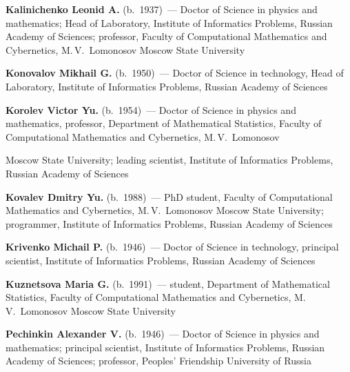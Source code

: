 \begin{multicols}{2}
\noindent
\textbf{Kalinichenko Leonid A.} (b.\ 1937)~--- Doctor of Science in physics and mathematics; 
Head of Laboratory, Institute of Informatics Problems, Russian Academy of Sciences; 
professor, Faculty of Computational Mathematics and Cybernetics, M.\,V.~Lomonosov 
Moscow State Univer\-sity 

\vspace*{3pt}


\noindent
\textbf{Konovalov Mikhail G.} (b.\ 1950)~--- Doctor of Science in technology, Head of 
Laboratory, Institute of Informatics Problems, Russian Academy of Sciences

\vspace*{3pt} 



\noindent \textbf{Korolev Victor Yu.} (b.\ 1954)~--- Doctor of Science in 
physics and mathematics, professor, Department of Mathematical Statistics, 
Faculty of Computational Mathematics and Cybernetics, M.\,V.~Lomonosov\linebreak\vspace*{-12pt}

\columnbreak

\noindent
 Moscow 
State University; leading scientist, Institute of Informatics Problems, Russian 
Academy of Sciences 

\vspace*{3pt}

\noindent
\textbf{Kovalev Dmitry Yu.} (b.\ 1988)~--- PhD student, Faculty of Computational 
Mathematics and Cybernetics, M.\,V.~Lomonosov Moscow State University; 
programmer, Institute of Informatics Problems, Russian Academy of Sciences

\vspace*{3pt}

\noindent
\textbf{Krivenko Michail P.} (b.\ 1946)~--- 
Doctor of Science in technology, principal scientist, Institute of Informatics 
Problems, Russian Academy of Sciences 

\vspace*{3pt}

\noindent
\textbf{Kuznetsova Maria G.} (b.\ 1991)~--- student, Department of Mathematical Statistics, 
Faculty of Computational Mathematics and Cybernetics, M.\,V.~Lomonosov Moscow 
State University





\vspace*{3pt}

\noindent \textbf{Pechinkin Alexander V.} (b.\ 1946)~--- Doctor of Science in 
physics and mathematics; principal scientist, Institute of Informatics Problems, 
Russian Academy of Sciences; professor, Peoples' Friendship University 
of Russia


\end{multicols}
